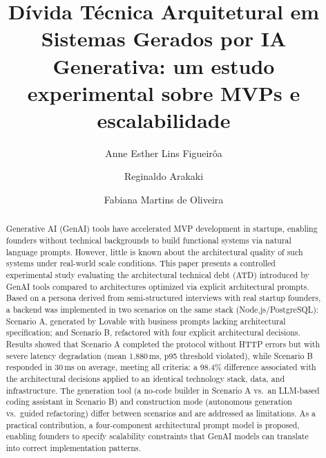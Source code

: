 \documentclass[sigconf]{acmart}
\renewcommand\abstractname{Resumo}
\begin{document}
\title{Dívida Técnica Arquitetural em Sistemas Gerados por IA Generativa: um estudo experimental sobre MVPs e escalabilidade}

\author{Anne Esther Lins Figueirôa}

\author{Reginaldo Arakaki}

\author{Fabiana Martins de Oliveira}

\renewcommand{\shortauthors}{Figueirôa et al.}
\renewcommand{\shorttitle}{Dívida Técnica Arquitetural em Soluções Geradas por IA}

\renewcommand\abstractname{Abstract}
\begin{abstract}
Generative AI (GenAI) tools have accelerated MVP development in startups, enabling
founders without technical backgrounds to build functional systems via natural language
prompts. However, little is known about the architectural quality of such systems under
real-world scale conditions. This paper presents a controlled experimental study
evaluating the architectural technical debt (ATD) introduced by GenAI tools compared
to architectures optimized via explicit architectural prompts. Based on a persona
derived from semi-structured interviews with real startup founders, a backend was
implemented in two scenarios on the same stack (Node.js/PostgreSQL): Scenario A,
generated by Lovable with business prompts lacking architectural specification; and
Scenario B, refactored with four explicit architectural decisions. Results showed that
Scenario A completed the protocol without HTTP errors but with severe latency
degradation (mean 1,880\,ms, p95 threshold violated), while Scenario B responded
in 30\,ms on average, meeting all criteria: a 98.4\% difference associated with the
architectural decisions applied to an identical technology stack, data, and
infrastructure. The generation tool (a no-code builder in Scenario A vs.\ an
LLM-based coding assistant in Scenario B) and construction mode (autonomous
generation vs.\ guided refactoring) differ between scenarios and are addressed
as limitations.
As a practical contribution, a four-component architectural prompt model is proposed,
enabling founders to specify scalability constraints that GenAI models can translate
into correct implementation patterns.
\end{abstract}
\end{document}
